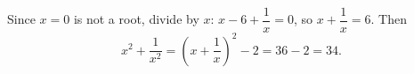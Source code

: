 Since $x=0$ is not a root, divide by $x$: $x-6+\dfrac{1}{x}=0$, so $x+\dfrac{1}{x}=6$. Then
\[
x^2+\dfrac{1}{x^2}=\left(x+\dfrac{1}{x}\right)^2-2=36-2=\boxed{34}.
\]
